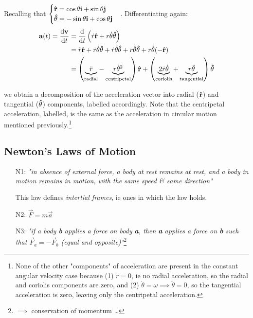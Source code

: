 \documentclass[12pt]{article}
\begin{document}
Recalling that $\begin{cases}
  \vectorunit{r} = \cos \theta \vb{i} + \sin \theta \vb{j}\\
  \vectorunit{\theta} = -\sin \theta \vb{i} + \cos \theta \vb{j}
\end{cases}$.
Differentiating again:
\begin{align*}
  \vb{a}(t) = \dv{\vb{v}}{t} &= \dv{t}\left(\dot{r}\vectorunit{r} + r \dot{\theta} \vectorunit{\theta}\right)\\
  &= \ddot{r}\vectorunit{r} + \dot{r}\dot{\theta}\vectorunit{\theta} + \dot{r}\dot{\theta}\vectorunit{\theta} + r \ddot{\theta}\vectorunit{\theta} + r \dot{\theta}(-\vectorunit{r})\\
  &= \left(\underbrace{\ddot{r}}_{\text{radial}} - \underbrace{r \dot{\theta}^2}_{\text{centripetal}}\right)\vectorunit{r} + \left(\underbrace{2\dot{r}\dot{\theta}}_{\text{coriolis}} + \underbrace{r \ddot{\theta}}_{\text{tangential}}\right)\vectorunit{\theta}
\end{align*}

we obtain a decomposition of the acceleration vector into radial ($\vectorunit{r}$) and tangential ($\vectorunit{\theta}$) components, labelled accordingly. Note that the centripetal acceleration, labelled, is the same as the acceleration in circular motion mentioned previously.\footnote{None of the other "components" of acceleration are present in the constant angular velocity case because (1) $\ddot{r}=0$, ie no radial acceleration, so the radial and coriolis components are zero, and (2) $\dot{\theta} = \omega \implies \ddot{\theta} = 0$, so the tangential acceleration is zero, leaving only the centripetal acceleration.}\footnotemark



\subsection{Newton's Laws of Motion}
\begin{enumerate}
  \item[N1:] \textit{"in absence of external force, a body at rest remains at rest, and a body in motion remains in motion, with the same speed \& same direction"}
  
This law defines \textit{intertial frames}, ie ones in which the law holds.

  \item[N2:] $\vec{F} = m \vec{a}$
  \item[N3:] \textit{"if a body \textbf{b} applies a force on body \textbf{a}, then \textbf{a} applies a force on \textbf{b} such that $\vec{F}_a = -\vec{F}_b$ (equal and opposite)"}\footnote{$\implies$ conservation of momentum \dots}
\end{enumerate}
\end{document}
